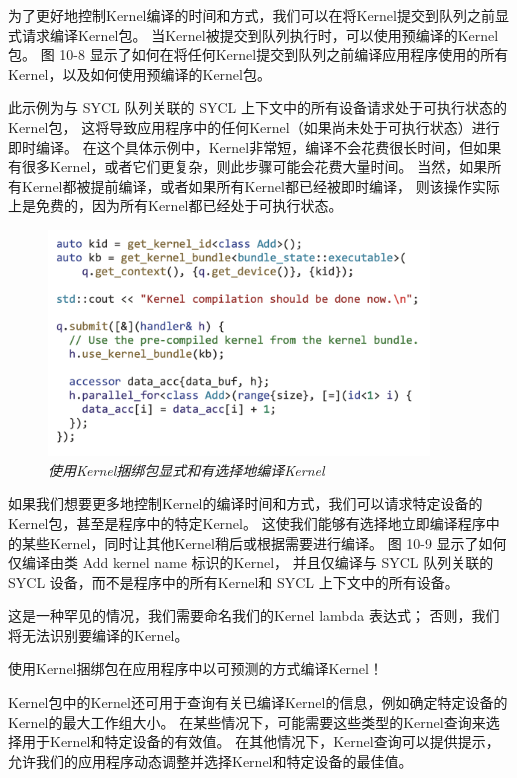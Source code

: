 为了更好地控制Kernel编译的时间和方式，我们可以在将Kernel提交到队列之前显式请求编译Kernel包。 
当Kernel被提交到队列执行时，可以使用预编译的Kernel包。 
图 10-8 显示了如何在将任何Kernel提交到队列之前编译应用程序使用的所有Kernel，以及如何使用预编译的Kernel包。

此示例为与 SYCL 队列关联的 SYCL 上下文中的所有设备请求处于可执行状态的Kernel包，
这将导致应用程序中的任何Kernel（如果尚未处于可执行状态）进行即时编译。 
在这个具体示例中，Kernel非常短，编译不会花费很长时间，但如果有很多Kernel，或者它们更复杂，则此步骤可能会花费大量时间。 
当然，如果所有Kernel都被提前编译，或者如果所有Kernel都已经被即时编译，
则该操作实际上是免费的，因为所有Kernel都已经处于可执行状态。

\begin{figure}[H]
	\centering
	\includegraphics[width=0.9\textwidth]{figs/F10.9.png}
	\caption{\textit{使用Kernel捆绑包显式和有选择地编译Kernel }}
\end{figure}

如果我们想要更多地控制Kernel的编译时间和方式，我们可以请求特定设备的Kernel包，甚至是程序中的特定Kernel。 
这使我们能够有选择地立即编译程序中的某些Kernel，同时让其他Kernel稍后或根据需要进行编译。 
图 10-9 显示了如何仅编译由类 Add kernel name 标识的Kernel，
并且仅编译与 SYCL 队列关联的 SYCL 设备，而不是程序中的所有Kernel和 SYCL 上下文中的所有设备。

这是一种罕见的情况，我们需要命名我们的Kernel lambda 表达式； 否则，我们将无法识别要编译的Kernel。

\begin{remark}
	使用Kernel捆绑包在应用程序中以可预测的方式编译Kernel！
\end{remark}

Kernel包中的Kernel还可用于查询有关已编译Kernel的信息，例如确定特定设备的Kernel的最大工作组大小。 
在某些情况下，可能需要这些类型的Kernel查询来选择用于Kernel和特定设备的有效值。 
在其他情况下，Kernel查询可以提供提示，允许我们的应用程序动态调整并选择Kernel和特定设备的最佳值。

